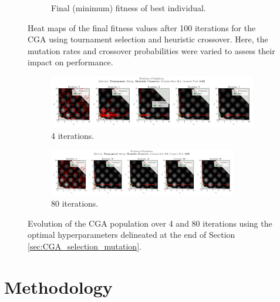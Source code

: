 \documentclass[10pt]{article}
\begin{document}
\begin{multicols}{2}
\begin{figure}[H]
\begin{subfigure}{0.46\textwidth}
        \caption{Final (minimum) fitness of best individual.}
        \label{fig:CGA_contour_tournament_Heuristic Crossover_MIN}
    \end{subfigure}
    \captionsetup{justification=centering}
    \caption{Heat maps of the final fitness values after 100 iterations for the CGA using tournament selection and heuristic crossover. Here, the mutation rates and crossover probabilities were varied to assess their impact on performance.}
    \label{fig:CGA_contour_rates}
\end{figure}

\end{multicols}

\begin{figure}[H]
    \centering
    \begin{subfigure}{0.9\textwidth}
        \centering
        \includegraphics[width=\textwidth]{../figures/Ungenerated Images/0.1_0.65_Population.png}
        \caption{4 iterations.}
        \label{fig:optimal_5}
    \end{subfigure}
    \begin{subfigure}{\textwidth}
        \centering
        \includegraphics[width=0.9\textwidth]{../figures/Ungenerated Images/0.1_0.65_Population100.png}
        \caption{80 iterations.}
        \label{fig:optimat_100}
    \end{subfigure}
    \captionsetup{justification=centering}
    \caption{Evolution of the CGA population over 4 and 80 iterations using the optimal hyperparameters delineated at the end of Section \ref{sec:CGA_selection_mutation}.}
    \label{fig:optimal_convergence}
\end{figure}
\section{Methodology}
\label{sec:CGA_QEG_comparison}
\end{document}
